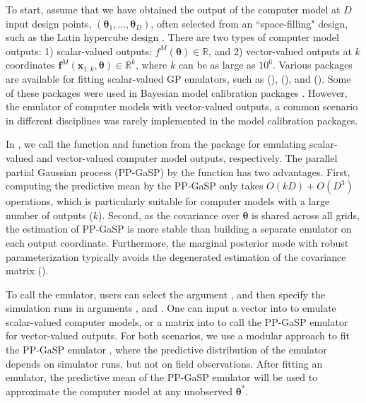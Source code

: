 To start, assume that we have obtained the output of the computer model at $D$ input design points, $(\bm \theta_1,...,\bm \theta_D)$, often selected from an ``space-filling" design, such as the Latin hypercube design \citep{santner2003design}. There are two types of computer model outputs: 1) scalar-valued outputs: $f^M(\bm \theta) \in \mathbb R$, and 2) vector-valued outputs at $k$ coordinates $\mathbf f^M(\mathbf x_{1:k}, \bm \theta) \in \mathbb R^k$, where $k$ can be as large as  $10^6$. 
Various packages are available for fitting scalar-valued GP emulators, such as  (\cite{roustant2012dicekriging}),  (\cite{macdonald2015gpfit}), and  (\cite{gu2018robustgasp}). Some of these packages were used in Bayesian model calibration packages \citep{palomo2015save,carmassi2018calico}. However, the emulator of computer models with vector-valued outputs, a common scenario in different disciplines \citep{higdon2008computer,ma2022multifidelity,li2022efficient,fang2022reliable} was rarely implemented in the model calibration packages.

 In , we call the  function and  function from the  package for emulating scalar-valued and vector-valued computer model outputs, respectively. The parallel partial Gaussian process (PP-GaSP) by the  function has two advantages. First, computing the predictive mean by  the PP-GaSP only takes $O(kD)+O(D^3)$  operations, which is particularly suitable for computer models with a large number of outputs ($k$). %
 {Second, as the covariance over $\bm \theta$ is shared across all grids, the estimation of PP-GaSP is more stable than building a separate emulator on each output coordinate.} Furthermore,  the marginal posterior mode with robust parameterization typically avoids the degenerated estimation of the covariance matrix (\cite{gu2019jointly}). 

To call the emulator, users can select the argument , and then specify the simulation runs in arguments , and  . One can input a vector into  to emulate scalar-valued computer models, or a matrix into  to call the PP-GaSP emulator for vector-valued outputs. For both scenarios, 
 we use a modular approach to fit the PP-GaSP emulator  \citep{bayarri2007framework,liu2009modularization}, where  the predictive distribution of the emulator depends on simulator runs, but not on field observations. After fitting an emulator, the predictive mean of the PP-GaSP emulator will be used to approximate the computer model at any unobserved $\bm \theta^*$. 


